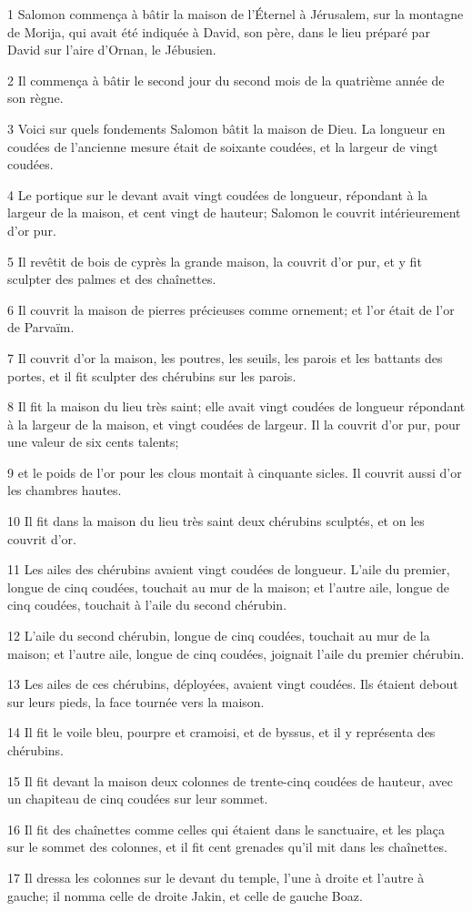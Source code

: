 \par 1 Salomon commença à bâtir la maison de l'Éternel à Jérusalem, sur la montagne de Morija, qui avait été indiquée à David, son père, dans le lieu préparé par David sur l'aire d'Ornan, le Jébusien.
\par 2 Il commença à bâtir le second jour du second mois de la quatrième année de son règne.
\par 3 Voici sur quels fondements Salomon bâtit la maison de Dieu. La longueur en coudées de l'ancienne mesure était de soixante coudées, et la largeur de vingt coudées.
\par 4 Le portique sur le devant avait vingt coudées de longueur, répondant à la largeur de la maison, et cent vingt de hauteur; Salomon le couvrit intérieurement d'or pur.
\par 5 Il revêtit de bois de cyprès la grande maison, la couvrit d'or pur, et y fit sculpter des palmes et des chaînettes.
\par 6 Il couvrit la maison de pierres précieuses comme ornement; et l'or était de l'or de Parvaïm.
\par 7 Il couvrit d'or la maison, les poutres, les seuils, les parois et les battants des portes, et il fit sculpter des chérubins sur les parois.
\par 8 Il fit la maison du lieu très saint; elle avait vingt coudées de longueur répondant à la largeur de la maison, et vingt coudées de largeur. Il la couvrit d'or pur, pour une valeur de six cents talents;
\par 9 et le poids de l'or pour les clous montait à cinquante sicles. Il couvrit aussi d'or les chambres hautes.
\par 10 Il fit dans la maison du lieu très saint deux chérubins sculptés, et on les couvrit d'or.
\par 11 Les ailes des chérubins avaient vingt coudées de longueur. L'aile du premier, longue de cinq coudées, touchait au mur de la maison; et l'autre aile, longue de cinq coudées, touchait à l'aile du second chérubin.
\par 12 L'aile du second chérubin, longue de cinq coudées, touchait au mur de la maison; et l'autre aile, longue de cinq coudées, joignait l'aile du premier chérubin.
\par 13 Les ailes de ces chérubins, déployées, avaient vingt coudées. Ils étaient debout sur leurs pieds, la face tournée vers la maison.
\par 14 Il fit le voile bleu, pourpre et cramoisi, et de byssus, et il y représenta des chérubins.
\par 15 Il fit devant la maison deux colonnes de trente-cinq coudées de hauteur, avec un chapiteau de cinq coudées sur leur sommet.
\par 16 Il fit des chaînettes comme celles qui étaient dans le sanctuaire, et les plaça sur le sommet des colonnes, et il fit cent grenades qu'il mit dans les chaînettes.
\par 17 Il dressa les colonnes sur le devant du temple, l'une à droite et l'autre à gauche; il nomma celle de droite Jakin, et celle de gauche Boaz.

